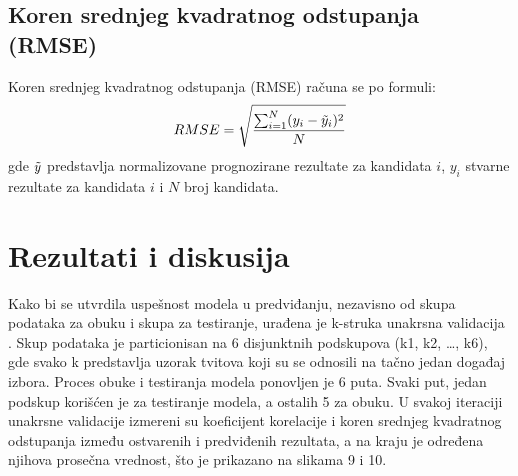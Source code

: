 \subsection{Koren srednjeg kvadratnog odstupanja (RMSE)}

Koren srednjeg kvadratnog odstupanja (RMSE) računa se po formuli:
\begin{equation*}
    RMSE = \sqrt{\frac{\sum^N_{i=1}(y_i - \Tilde{y}_i)^2}{N}}
\end{equation*}
gde $\Tilde{y}$ predstavlja normalizovane prognozirane rezultate za kandidata $i$, $y_i$ stvarne rezultate za
kandidata $i$ i $N$ broj kandidata.

\section{Rezultati i diskusija}

Kako bi se utvrdila uspešnost modela u predviđanju, nezavisno od skupa podataka za obuku i skupa za testiranje, urađena je k-struka unakrsna validacija \parencite{arlot2009crossvalidation}. Skup podataka je particionisan na 6 disjunktnih podskupova (k1, k2, …, k6), gde svako k predstavlja uzorak tvitova koji su se odnosili na tačno jedan događaj izbora. Proces obuke i testiranja modela ponovljen je 6 puta. Svaki put, jedan podskup korišćen je za testiranje modela, a ostalih 5 za obuku. U svakoj iteraciji unakrsne validacije izmereni su koeficijent korelacije i koren srednjeg kvadratnog odstupanja između ostvarenih i predviđenih rezultata, a na kraju je određena njihova prosečna vrednost, što je prikazano na slikama 9 i 10.

